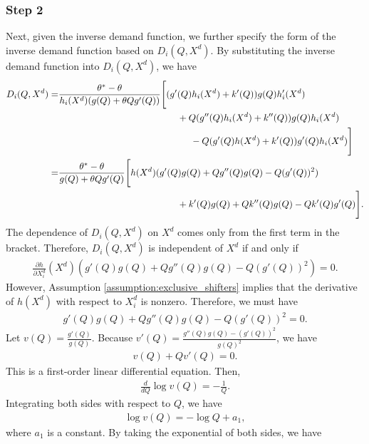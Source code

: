 \documentclass[11pt, a4paper]{article}
\theoremstyle{remark}
\begin{document}
\subsubsection*{Step 2}
Next, given the inverse demand function, we further specify the form of the inverse demand function based on $D_i(Q, X^{d})$.
By substituting the inverse demand function into $D_i(Q, X^{d})$, we have
\begin{align}
    D_i(Q, X^{d}) = &\frac{\theta^{*} - \theta}{h_i(X^{d})(g(Q) + \theta Q g'(Q))}\Bigg[
    (g'(Q)h_i(X^{d}) + k'(Q) )g(Q)h_i'(X^{d})\\
    & \hspace{4.5cm} + Q(g''(Q)h_i(X^{d}) + k''(Q))g(Q)h_i(X^{d}) \\
    &\hspace{5cm} - Q(g'(Q)h(X^{d}) + k'(Q))g'(Q)h_i(X^{d})\Bigg]\\
    =&  \frac{\theta^{*} - \theta}{g(Q) + \theta Q g'(Q)}\Bigg[h(X^{d})(g'(Q)g(Q) + Qg{''}(Q)g(Q) - Q (g'(Q))^{2})\\
    & \hspace{4.5cm} + k'(Q)g(Q) + Qk''(Q)g(Q) - Qk'(Q)g'(Q)\Bigg].
\end{align}
The dependence of $D_i(Q, X^{d})$ on $X^{d}$ comes only from the first term in the bracket.
Therefore, $D_i(Q, X^{d})$ is independent of $X^{d}$ if and only if
\begin{align}
    \frac{\partial h}{\partial X^{d}_i}(X^{d})(g'(Q)g(Q) + Qg{''}(Q)g(Q) - Q (g'(Q))^{2}) = 0.
\end{align}
However, Assumption \ref{assumption:exclusive_shifters} implies that the derivative of $h(X^{d})$ with respect to $X^{d}_i$ is nonzero.
Therefore, we must have 
\begin{align}
    g'(Q)g(Q) + Qg{''}(Q)g(Q) - Q (g'(Q))^{2} = 0.
\end{align}
Let $v(Q) = \frac{g'(Q)}{g(Q)}$.
Because $v'(Q) = \frac{g''(Q)g(Q) - (g'(Q))^2}{g(Q)^2}$, we have
\begin{align}
    v(Q) + Qv'(Q) = 0.
\end{align}
This is a first-order linear differential equation.
Then, 
\begin{align}
    \frac{d }{d Q}\log v(Q) = -\frac{1}{Q}.
\end{align}
Integrating both sides with respect to $Q$, we have
\begin{align}
    \log v(Q) = -\log Q + a_1,
\end{align}
where $a_1$ is a constant.
By taking the exponential of both sides, we have
\end{document}
